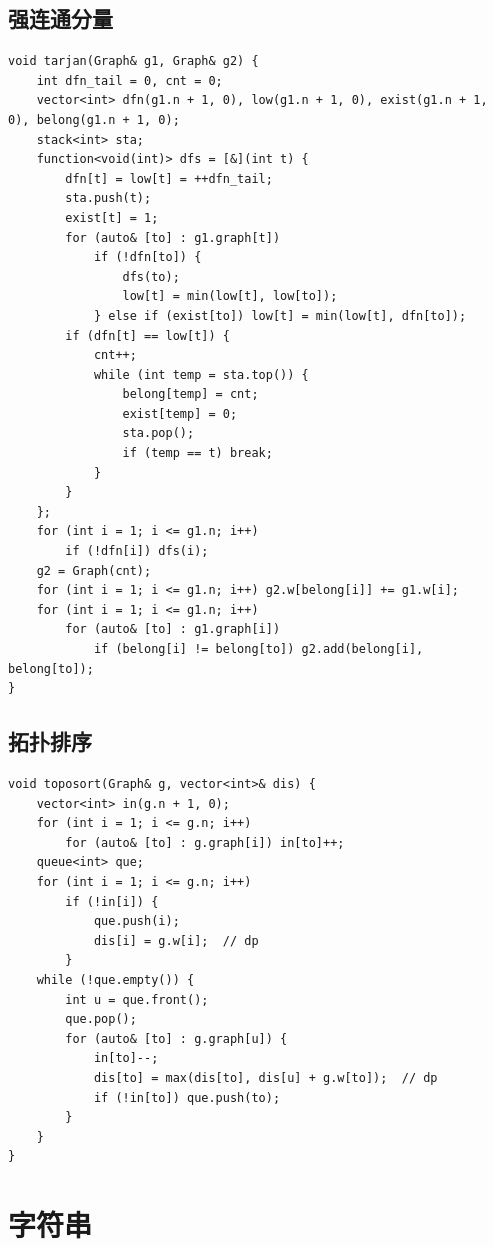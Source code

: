 \documentclass[UTF8, twoside]{ctexart}
\begin{document}
\begin{sloppypar}
\subsection{强连通分量}

\begin{lstlisting}[style=cpp]
void tarjan(Graph& g1, Graph& g2) {
    int dfn_tail = 0, cnt = 0;
    vector<int> dfn(g1.n + 1, 0), low(g1.n + 1, 0), exist(g1.n + 1, 0), belong(g1.n + 1, 0);
    stack<int> sta;
    function<void(int)> dfs = [&](int t) {
        dfn[t] = low[t] = ++dfn_tail;
        sta.push(t);
        exist[t] = 1;
        for (auto& [to] : g1.graph[t])
            if (!dfn[to]) {
                dfs(to);
                low[t] = min(low[t], low[to]);
            } else if (exist[to]) low[t] = min(low[t], dfn[to]);
        if (dfn[t] == low[t]) {
            cnt++;
            while (int temp = sta.top()) {
                belong[temp] = cnt;
                exist[temp] = 0;
                sta.pop();
                if (temp == t) break;
            }
        }
    };
    for (int i = 1; i <= g1.n; i++)
        if (!dfn[i]) dfs(i);
    g2 = Graph(cnt);
    for (int i = 1; i <= g1.n; i++) g2.w[belong[i]] += g1.w[i];
    for (int i = 1; i <= g1.n; i++)
        for (auto& [to] : g1.graph[i])
            if (belong[i] != belong[to]) g2.add(belong[i], belong[to]);
}
\end{lstlisting}

\subsection{拓扑排序}

\begin{lstlisting}[style=cpp]
void toposort(Graph& g, vector<int>& dis) {
    vector<int> in(g.n + 1, 0);
    for (int i = 1; i <= g.n; i++)
        for (auto& [to] : g.graph[i]) in[to]++;
    queue<int> que;
    for (int i = 1; i <= g.n; i++)
        if (!in[i]) {
            que.push(i);
            dis[i] = g.w[i];  // dp
        }
    while (!que.empty()) {
        int u = que.front();
        que.pop();
        for (auto& [to] : g.graph[u]) {
            in[to]--;
            dis[to] = max(dis[to], dis[u] + g.w[to]);  // dp
            if (!in[to]) que.push(to);
        }
    }
}
\end{lstlisting}

\clearpage

\section{字符串}


\end{sloppypar}
\end{document}
